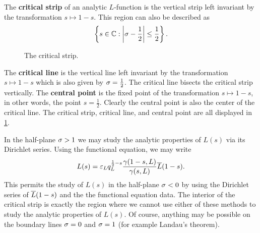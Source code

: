     The \textbf{critical strip} of an analytic \(L\)-function is the vertical strip left invariant by the transformation \(s \mapsto 1-s\). This region can also be described as
    \[
      \left\{s \in \mathbb{C}:\left|\sigma-\frac{1}{2}\right| \le \frac{1}{2}\right\}.
    \]

    \begin{figure}[h]
      \centering
      \caption{The critical strip.}
      \label{fig:critical_strip}
    \end{figure}

    The \textbf{critical line} is the vertical line left invariant by the transformation \(s \mapsto 1-s\) which is also given by \(\sigma = \frac{1}{2}\). The critical line bisects the critical strip vertically. The \textbf{central point} is the fixed point of the transformation \(s \mapsto 1-s\), in other words, the point \(s = \frac{1}{2}\). Clearly the central point is also the center of the critical line. The critical strip, critical line, and central point are all displayed in \cref{fig:critical_strip}.

    In the half-plane \(\sigma > 1\) we may study the analytic properties of \(L(s)\) via its Dirichlet series. Using the functional equation, we may write
    \[
      L(s) = \varepsilon_{L}q_{L}^{\frac{1}{2}-s}\frac{\gamma(1-s,L)}{\gamma(s,L)}\overline{L}(1-s).
    \]
    This permits the study of \(L(s)\) in the half-plane \(\sigma < 0\) by using the Dirichlet series of \(\overline{L}(1-s)\) and the the functional equation data. The interior of the critical strip is exactly the region where we cannot use either of these methods to study the analytic properties of \(L(s)\). Of course, anything may be possible on the boundary lines \(\sigma = 0\) and \(\sigma = 1\) (for example Landau's theorem).
